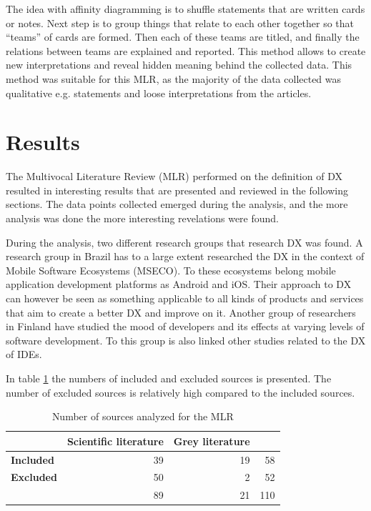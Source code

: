 \documentclass[english, 12pt, a4paper, sci, utf8, a-1b, online]{aaltothesis}
\begin{document}
The idea with affinity diagramming is to shuffle statements that are written cards or notes. Next step is to group things that relate to each other together so that ``teams'' of cards are formed. Then each of these teams are titled, and finally the relations between teams are explained and reported. This method allows to create new interpretations and reveal hidden meaning behind the collected data. This method was suitable for this MLR, as the majority of the data collected was qualitative e.g. statements and loose interpretations from the articles.

\clearpage
\section{Results} \label{section:results}

The Multivocal Literature Review (MLR) performed on the definition of DX resulted in interesting results that are presented and reviewed in the following sections. The data points collected emerged during the analysis, and the more analysis was done the more interesting revelations were found.

During the analysis, two different research groups that research DX was found. A research group in Brazil has to a large extent researched the DX in the context of Mobile Software Ecosystems (MSECO). To these ecosystems belong mobile application development platforms as Android and iOS. Their approach to DX can however be seen as something applicable to all kinds of products and services that aim to create a better DX and improve on it. Another group of researchers in Finland have studied the mood of developers and its effects at varying levels of software development. To this group is also linked other studies related to the DX of IDEs.

In table \ref{table:number-of-sources} the numbers of included and excluded sources is presented. The number of excluded sources is relatively high compared to the included sources.

\begin{table}[ht]
  \begin{center}
    \begin{tabular}{l | r r | r}
                        & \textbf{Scientific literature} & \textbf{Grey literature} &     \\
      \hline
      \textbf{Included} & 39                             & 19                       & 58  \\
      \textbf{Excluded} & 50                             & 2                        & 52  \\
      \hline
                        & 89                             & 21                       & 110
    \end{tabular}
    \captionsetup{width=0.6\textwidth}
    \caption{Number of sources analyzed for the MLR}
    \label{table:number-of-sources}
  \end{center}
\end{table}
\end{document}
